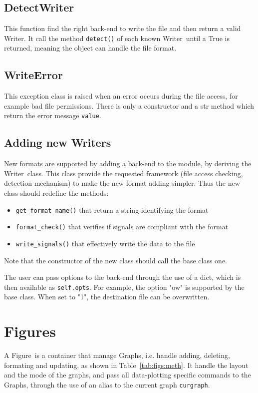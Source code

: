 \documentclass[a4paper,11pt]{article}
\newcommand{\att}[1]{\texttt{#1}}
\newcommand{\meth}[1]{\texttt{#1()}}
\newcommand{\cls}[1]{\textsf{#1}}
\newcommand{\wrt}{\cls{Writer}}
\newcommand{\graph}{\cls{Graph}}
\newcommand{\fig}{\cls{Figure}}
\begin{document}
\subsection{DetectWriter}
This function find the right back-end to write the file and then return a valid \wrt.
It call the method \meth{detect} of each known \wrt\ until a True is returned, meaning the object can handle the file format.

\subsection{WriteError}
This exception class is raised when an error occurs during the file access, for example bad file permissions.
There is only a constructor and a str method which return the error message \att{value}.

\subsection{Adding new Writers}
New formats are supported by adding a back-end to the module, by deriving the \wrt\ class.
This class provide the requested framework (file access checking, detection mechanism) to make the new format adding simpler.
Thus the new class should redefine the methods:
\begin{itemize}
\item \meth{get\_format\_name} that return a string identifying the format
\item \meth{format\_check} that verifies if signals are compliant with the format
\item \meth{write\_signals} that effectively write the data to the file
\end{itemize}
Note that the constructor of the new class should call the base class one.

The user can pass options to the back-end through the use of a dict, which is then available as \att{self.opts}.
For example, the option "ow" is supported by the base class.
When set to "1", the destination file can be overwritten.

\section{Figures}
\label{sec:figs}
A \fig\ is a container that manage \graph s, i.e. handle adding, deleting, formating and updating, as shown in Table~\ref{tab:figs:meth}.
It handle the layout and the mode of the graphs, and pass all data-plotting specific commands to the \graph s, through the use of an alias to the current graph \att{curgraph}.
\end{document}

